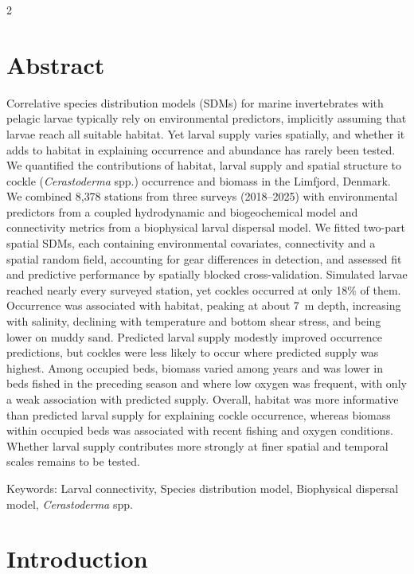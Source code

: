 \begin{spacing}{2}
\section*{Abstract}
Correlative species distribution models (SDMs) for marine invertebrates with pelagic larvae typically rely on environmental predictors, implicitly assuming that larvae reach all suitable habitat. Yet larval supply varies spatially, and whether it adds to habitat in explaining occurrence and abundance has rarely been tested. We quantified the contributions of habitat, larval supply and spatial structure to cockle (\textit{Cerastoderma} spp.) occurrence and biomass
in the Limfjord, Denmark. We combined 8{,}378 stations from three surveys (2018--2025) with environmental predictors from a coupled hydrodynamic and biogeochemical model and connectivity metrics from a biophysical larval dispersal model. We fitted two-part spatial SDMs, each containing environmental covariates, connectivity and a spatial random field, accounting for gear differences in detection, and assessed fit and predictive performance by spatially blocked cross-validation. Simulated larvae reached nearly every surveyed station, yet cockles occurred at only 18\% of them. Occurrence was associated with habitat, peaking at about 7~m depth, increasing with salinity, declining with temperature and bottom shear stress, and being lower on muddy sand. Predicted larval supply modestly improved occurrence predictions, but cockles were less likely to occur where predicted supply was highest. Among occupied beds, biomass varied among years and was lower in beds fished in the preceding season and where low oxygen was frequent, with only a weak association with predicted supply. Overall, habitat was more informative than predicted larval supply for explaining cockle occurrence, whereas biomass within occupied beds was associated with recent fishing and oxygen conditions. Whether larval supply contributes more strongly at finer spatial and temporal scales remains to be tested.


\vspace*{\fill}
\noindent
Keywords:
Larval connectivity,
Species distribution model,
Biophysical dispersal model,
\textit{Cerastoderma} spp.\\
\clearpage
\section{Introduction}


\end{spacing}
